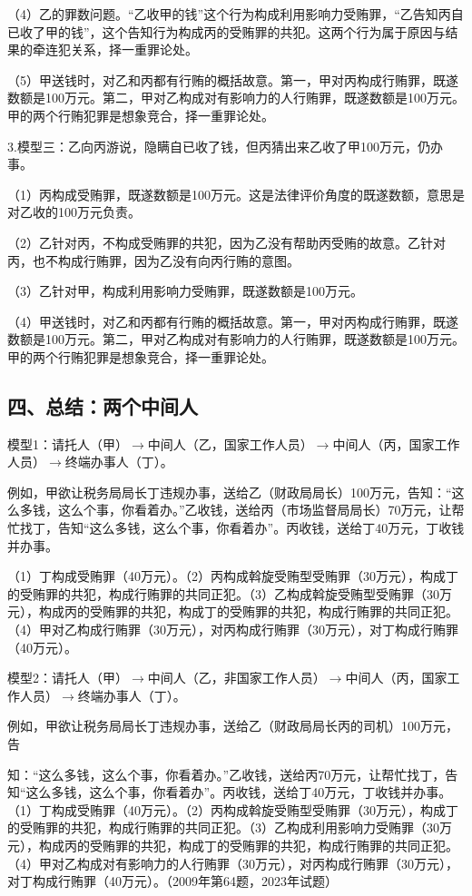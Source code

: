 （4）乙的罪数问题。“乙收甲的钱”这个行为构成利用影响力受贿罪，“乙告知丙自已收了甲的钱”，这个告知行为构成丙的受贿罪的共犯。这两个行为属于原因与结果的牵连犯关系，择一重罪论处。

（5）甲送钱时，对乙和丙都有行贿的概括故意。第一，甲对丙构成行贿罪，既遂数额是100万元。第二，甲对乙构成对有影响力的人行贿罪，既遂数额是100万元。甲的两个行贿犯罪是想象竞合，择一重罪论处。

3.模型三：乙向丙游说，隐瞒自已收了钱，但丙猜出来乙收了甲100万元，仍办事。

（1）丙构成受贿罪，既遂数额是100万元。这是法律评价角度的既遂数额，意思是对乙收的100万元负责。

（2）乙针对丙，不构成受贿罪的共犯，因为乙没有帮助丙受贿的故意。乙针对丙，也不构成行贿罪，因为乙没有向丙行贿的意图。

（3）乙针对甲，构成利用影响力受贿罪，既遂数额是100万元。

（4）甲送钱时，对乙和丙都有行贿的概括故意。第一，甲对丙构成行贿罪，既遂数额是100万元。第二，甲对乙构成对有影响力的人行贿罪，既遂数额是100万元。甲的两个行贿犯罪是想象竞合，择一重罪论处。

\subsection*{四、总结：两个中间人}

模型1：请托人（甲）\ensuremath{\rightarrow}中间人（乙，国家工作人员）\ensuremath{\rightarrow}中间人（丙，国家工作人员）\ensuremath{\rightarrow}终端办事人（丁）。

例如，甲欲让税务局局长丁违规办事，送给乙（财政局局长）100万元，告知：“这么多钱，这么个事，你看着办。”乙收钱，送给丙（市场监督局局长）70万元，让帮忙找丁，告知“这么多钱，这么个事，你看着办”。丙收钱，送给丁40万元，丁收钱并办事。

（1）丁构成受贿罪（40万元）。（2）丙构成斡旋受贿型受贿罪（30万元），构成丁的受贿罪的共犯，构成行贿罪的共同正犯。（3）乙构成斡旋受贿型受贿罪（30万元），构成丙的受贿罪的共犯，构成丁的受贿罪的共犯，构成行贿罪的共同正犯。（4）甲对乙构成行贿罪（30万元），对丙构成行贿罪（30万元），对丁构成行贿罪（40万元）。

模型2：请托人（甲）\ensuremath{\rightarrow}中间人（乙，非国家工作人员）\ensuremath{\rightarrow}中间人（丙，国家工作人员）\ensuremath{\rightarrow}终端办事人（丁）。

例如，甲欲让税务局局长丁违规办事，送给乙（财政局局长丙的司机）100万元，告

知：“这么多钱，这么个事，你看着办。”乙收钱，送给丙70万元，让帮忙找丁，告知“这么多钱，这么个事，你看着办”。丙收钱，送给丁40万元，丁收钱并办事。（1）丁构成受贿罪（40万元）。（2）丙构成斡旋受贿型受贿罪（30万元），构成丁的受贿罪的共犯，构成行贿罪的共同正犯。（3）乙构成利用影响力受贿罪（30万元），构成丙的受贿罪的共犯，构成丁的受贿罪的共犯，构成行贿罪的共同正犯。（4）甲对乙构成对有影响力的人行贿罪（30万元），对丙构成行贿罪（30万元），对丁构成行贿罪（40万元）。（2009年第64题，2023年试题）

